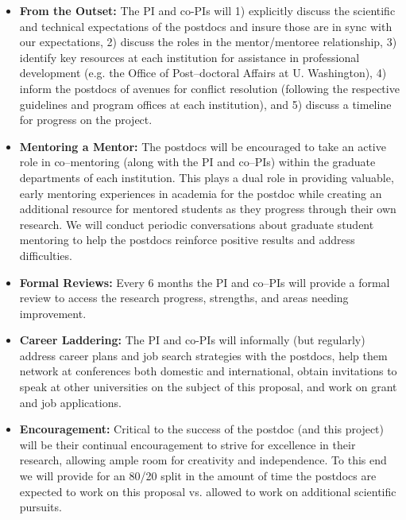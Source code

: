 \documentclass[11pt]{article}
\begin{document}
\begin{itemize}

\item \textbf{From the Outset:} The PI and co-PIs will 1) explicitly discuss the
scientific and technical expectations of the postdocs and insure those are in
sync with our expectations, 2) discuss the roles in the mentor/mentoree
relationship, 3) identify key resources at each institution for assistance in
professional development (e.g. the Office of Post--doctoral Affairs at U.
Washington), 4) inform the postdocs of avenues for conflict resolution
(following the respective guidelines and program offices at each institution),
and 5) discuss a timeline for progress on the project.

\item \textbf{Mentoring a Mentor:} The postdocs will be encouraged to take an
active role in co--mentoring (along with the PI and co--PIs) within the graduate
departments of each institution.  This plays a dual role in providing valuable,
early mentoring experiences in academia for the postdoc while creating an
additional resource for mentored students as they progress through their own
research. We will conduct periodic conversations about graduate student
mentoring to help the postdocs reinforce positive results and address
difficulties.

\item \textbf{Formal Reviews:} Every 6 months the PI and co--PIs will provide a
formal review to access the research progress, strengths, and areas needing
improvement.

\item \textbf{Career Laddering:} The PI and co-PIs will informally (but
regularly) address career plans and job search strategies with the postdocs,
help them network at conferences both domestic and international, obtain
invitations to speak at other universities on the subject of this proposal, and
work on grant and job applications.

\item \textbf{Encouragement:} Critical to the success of the postdoc (and this
project) will be their continual encouragement to strive for excellence in their
research, allowing ample room for creativity and independence.  To this end we
will provide for an 80/20 split in the amount of time the postdocs are expected
to work on this proposal vs. allowed to work on additional scientific pursuits.

\end{itemize}
\end{document}
